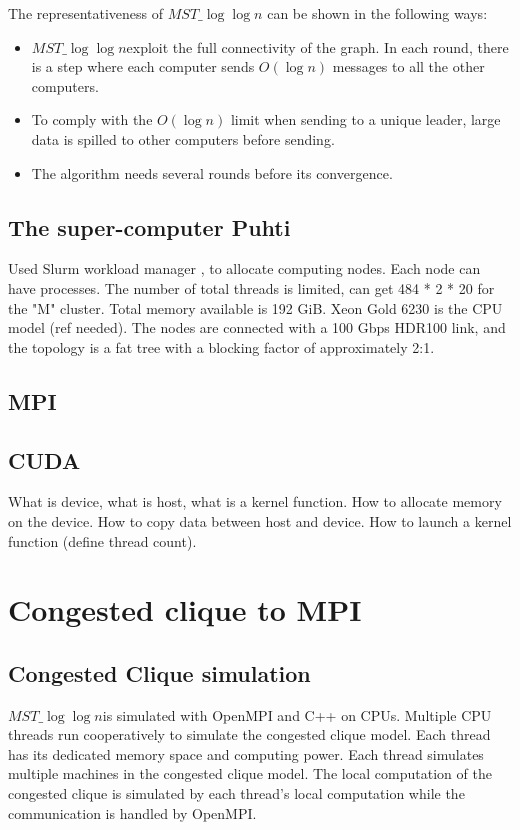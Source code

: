 \documentclass[english, 12pt, a4paper, elec, utf8, a-2b, online]{aaltothesis}
\newcommand{\mstalgo}{$MST\_\log\log{n}$}
\begin{document}
The representativeness of \mstalgo{} can be shown in the following ways:
\begin{itemize}
	\item[--] \mstalgo exploit the full connectivity of the graph. In each round, there is a step where each computer sends $O(\log{n})$ messages to all the other computers.
	\item[--] To comply with the $O(\log{n})$ limit when sending to a unique leader, large data is spilled to other computers before sending.
	\item[--] The algorithm needs several rounds before its convergence.
\end{itemize}

\subsection{The super-computer Puhti}
Used Slurm workload manager \cite{Slurm}, to allocate computing nodes. Each node can have processes. The number of total threads is limited, can get 484 * 2 * 20 for the "M" cluster. Total memory available is 192 GiB. Xeon Gold 6230 is the CPU model (ref needed).
The nodes are connected with a 100 Gbps HDR100 link, and the topology is a fat tree with a blocking factor of approximately 2:1. \cite{PuhtiDoc}

\subsection{MPI}

\subsection{CUDA}
What is device, what is host, what is a kernel function. How to allocate memory on the device. How to copy data between host and device. How to launch a kernel function (define thread count). 

\clearpage

\section{Congested clique to MPI}
\subsection{Congested Clique simulation}
\mstalgo is simulated with OpenMPI and C++ on CPUs. Multiple CPU threads run cooperatively to simulate the congested clique model. Each thread has its dedicated memory space and computing power. Each thread simulates multiple machines in the congested clique model. The local computation of the congested clique is simulated by each thread's local computation while the communication is handled by OpenMPI.
\end{document}
